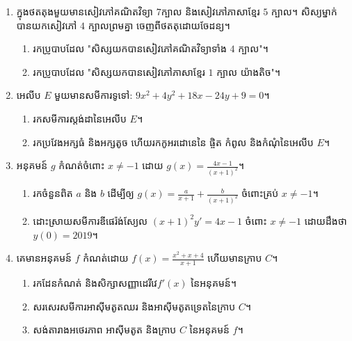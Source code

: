 \documentclass{officialexam}
\begin{document}
  \maketitle
  \begin{enumerate}[I]
  	\item ក្នុងថតតុងមួយមានសៀវភៅគណិតវិទ្យា $7$ក្បាល និងសៀវភៅភាសាខ្មែរ $5$ ក្បាល។ សិស្យម្នាក់បានយកសៀវភៅ $4$ ក្បាលព្រមគ្នា ចេញពីថតតុដោយចែដន្យ។
  	\begin{enumerate}[k]
  		\item រកប្រូបាបដែល "សិស្សយកបានសៀវភៅគណិតវិទ្យាទាំង $4$ ក្បាល"។
  		\item រកប្រូបាបដែល "សិស្សយកបានសៀវភៅភាសាខ្មែរ $1$  ក្បាល យ៉ាងតិច"។
  	\end{enumerate}
  	\item អេលីប $E$ មួយមានសមីការទូទៅ: $9x^2+4y^2+18x-24y+9=0$។
  	\begin{enumerate}[k]
  		\item រកសមីការស្តង់ដានៃអេលីប $E$។
  		\item រកប្រវែងអក្សធំ និងអក្សតូច ហើយរកកូអរដោនេនៃ ផ្ចិត កំពូល និងកំណុំនៃអេលីប $E$។
  	\end{enumerate}
  	\item អនុគមន៍ $g$ កំណត់ចំពោះ $x\ne -1$ ដោយ $g(x)=\frac{4x-1}{\left(x+1\right)^2}$។
  	\begin{enumerate}[k]
  		\item រកចំនួនពិត $a$ និង $b$ ដើម្បីឲ្យ $g(x)=\frac{a}{x+1}+\frac{b}{\left(x+1\right)^2}$ ចំពោះគ្រប់ $x\ne-1$។
  		\item ដោះស្រាយសមីការឌីផេរ៉ង់ស្យែល $\left(x+1\right)^2y'=4x-1$ ចំពោះ $x\ne -1$ ដោយដឹងថា $y(0)=2019$។
  	\end{enumerate}
  	\item គេមានអនុគមន៍ $f$ កំណត់ដោយ $f(x)=\frac{x^2+x+4}{x+1}$ ហើយមានក្រាប $C$។
  	\begin{enumerate}[k]
  		\item រកដែនកំណត់ និងសិក្សាសញ្ញាដេរីវេ​ $f'(x)$ នៃអនុគមន៍។
  		\item សរសេរសមីការអាសុីមតូតឈរ និងអាសុីមតូតទ្រេតនៃក្រាប $C$។
  		\item សង់តារាងអថេរភាព អាសុីមតូត និងក្រាប $C$ នៃអនុគមន៍ $f$។
  	\end{enumerate}
  \end{enumerate}
  \newpage
  \maketitle
\end{document}
